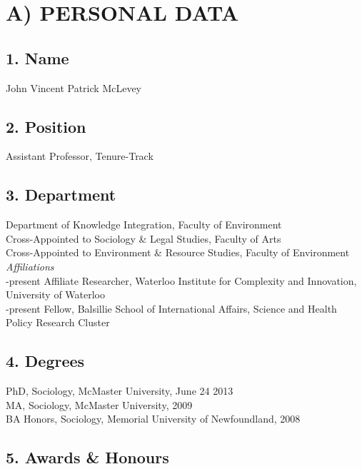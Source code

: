 \documentclass[9pt,usenames,dvipsnames]{article}
\begin{document}
\bigskip

\section*{A) PERSONAL DATA}

\subsection*{1. Name}

John Vincent Patrick McLevey

\subsection*{2. Position}

Assistant Professor, Tenure-Track 

\subsection*{3. Department}

\noindent Department of Knowledge Integration, Faculty of Environment \\   
\noindent Cross-Appointed to Sociology \& Legal Studies, Faculty of Arts \\ 
\noindent Cross-Appointed to Environment \& Resource Studies, Faculty of Environment \\

\noindent \emph{Affiliations}\\

-present Affiliate Researcher, Waterloo Institute for Complexity and Innovation, University of Waterloo \\

-present Fellow, Balsillie School of International Affairs, Science and Health Policy Research Cluster

\subsection*{4. Degrees}

\noindent PhD, Sociology, McMaster University, June 24 2013 \\  
\noindent MA, Sociology, McMaster University, 2009  \\
\noindent BA Honors, Sociology, Memorial University of Newfoundland, 2008

\subsection*{5. Awards \& Honours}
\end{document}
